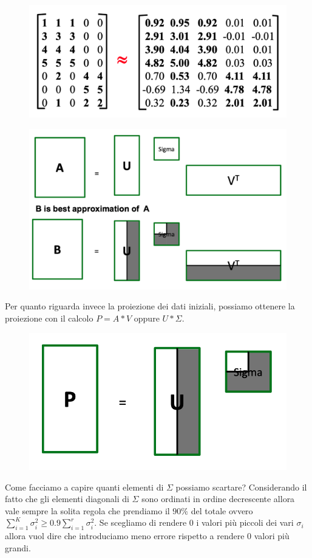 \documentclass[14pt]{extreport}
\begin{document}
\begin{figure}[H]
	\centering
	\includegraphics[width=0.7\linewidth]{507.jpeg}
\end{figure}


\begin{figure}[H]
	\centering
	\includegraphics[width=0.7\linewidth]{508.jpeg}
\end{figure}

Per quanto riguarda invece la proiezione dei dati iniziali, possiamo ottenere la proiezione con il calcolo $P=A*V$ oppure $U*\Sigma$.

\begin{figure}[H]
	\centering
	\includegraphics[width=0.7\linewidth]{509.jpeg}
\end{figure}

Come facciamo a capire quanti elementi di $\Sigma$ possiamo scartare? Considerando il fatto che gli elementi diagonali di $\Sigma$ sono ordinati in
ordine decrescente allora vale sempre la solita regola che prendiamo il $90\%$ del totale ovvero $\sum_{i=1}^K \sigma_i^2 \geq 0.9 \sum_{i=1}^r
\sigma_i^2$. Se scegliamo di rendere 0 i valori più piccoli dei vari $\sigma_i$ allora vuol dire che introduciamo meno errore rispetto a rendere 0
valori più grandi.
\end{document}
